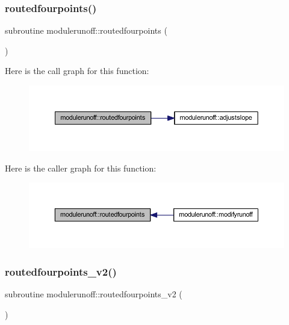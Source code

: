 \subsubsection{\texorpdfstring{routedfourpoints()}{routedfourpoints()}}
{\footnotesize\ttfamily subroutine modulerunoff\+::routedfourpoints (\begin{DoxyParamCaption}{ }\end{DoxyParamCaption})\hspace{0.3cm}{\ttfamily [private]}}

Here is the call graph for this function\+:\nopagebreak
\begin{figure}[H]
\begin{center}
\leavevmode
\includegraphics[width=350pt]{namespacemodulerunoff_a0a2296b090b1a35c74f3a4c0e35ad401_cgraph}
\end{center}
\end{figure}
Here is the caller graph for this function\+:\nopagebreak
\begin{figure}[H]
\begin{center}
\leavevmode
\includegraphics[width=350pt]{namespacemodulerunoff_a0a2296b090b1a35c74f3a4c0e35ad401_icgraph}
\end{center}
\end{figure}
\mbox{\label{namespacemodulerunoff_aeedcf3916bc6da030fd004afb251262f}} 
\subsubsection{\texorpdfstring{routedfourpoints\+\_\+v2()}{routedfourpoints\_v2()}}
{\footnotesize\ttfamily subroutine modulerunoff\+::routedfourpoints\+\_\+v2 (\begin{DoxyParamCaption}{ }\end{DoxyParamCaption})\hspace{0.3cm}{\ttfamily [private]}}

